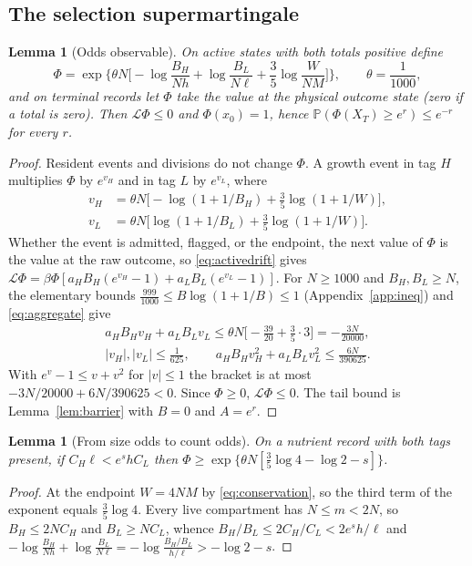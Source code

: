 \documentclass[11pt,a4paper]{article}
\theoremstyle{plain}
\newtheorem{lemma}[theorem]{Lemma}
\theoremstyle{definition}
\theoremstyle{remark}
\newcommand{\Prb}{\mathbb P}
\newcommand{\cL}{\mathcal L}
\begin{document}
\subsection{The selection supermartingale}
\begin{lemma}[Odds observable]\label{lem:odds}
On active states with both totals positive define
\begin{equation}\label{eq:oddsobservable}
\Phi=\exp\Big\{\theta N\Big[-\log\frac{B_H}{Nh}+\log\frac{B_L}{N\ell}+\frac35\log\frac{W}{NM}\Big]\Big\},\qquad \theta=\frac1{1000},
\end{equation}
and on terminal records let $\Phi$ take the value at the physical outcome state (zero if a total is zero). Then $\cL\Phi\leq0$ and $\Phi(x_0)=1$, hence $\Prb(\Phi(X_T)\geq e^{r})\leq e^{-r}$ for every $r$.
\end{lemma}
\begin{proof}
Resident events and divisions do not change $\Phi$. A growth event in tag $H$ multiplies $\Phi$ by $e^{v_H}$ and in tag $L$ by $e^{v_L}$, where
\begin{align*}
v_H&=\theta N\big[-\log(1+1/B_H)+\tfrac35\log(1+1/W)\big],\\
v_L&=\theta N\big[\log(1+1/B_L)+\tfrac35\log(1+1/W)\big].
\end{align*}
Whether the event is admitted, flagged, or the endpoint, the next value of $\Phi$ is the value at the raw outcome, so \eqref{eq:activedrift} gives $\cL\Phi=\beta\Phi[a_HB_H(e^{v_H}-1)+a_LB_L(e^{v_L}-1)]$. For $N\geq1000$ and $B_H,B_L\geq N$, the elementary bounds $\frac{999}{1000}\leq B\log(1+1/B)\leq1$ (Appendix~\ref{app:ineq}) and \eqref{eq:aggregate} give
\begin{gather*}
a_HB_Hv_H+a_LB_Lv_L\leq\theta N\big[-\tfrac{39}{20}+\tfrac35\cdot3\big]=-\frac{3N}{20000},\\
|v_H|,|v_L|\leq\frac1{625},\qquad a_HB_Hv_H^2+a_LB_Lv_L^2\leq\frac{6N}{390625}.
\end{gather*}
With $e^{v}-1\leq v+v^2$ for $|v|\leq1$ the bracket is at most $-3N/20000+6N/390625<0$. Since $\Phi\geq0$, $\cL\Phi\leq0$. The tail bound is Lemma~\ref{lem:barrier} with $B=0$ and $A=e^r$.
\end{proof}

\begin{lemma}[From size odds to count odds]\label{lem:endpoint}
On a nutrient record with both tags present, if $C_H\ell<e^{s}hC_L$ then $\Phi\geq\exp\{\theta N[\frac35\log4-\log2-s]\}$.
\end{lemma}
\begin{proof}
At the endpoint $W=4NM$ by \eqref{eq:conservation}, so the third term of the exponent equals $\frac35\log4$. Every live compartment has $N\leq m<2N$, so $B_H\leq2NC_H$ and $B_L\geq NC_L$, whence $B_H/B_L\leq2C_H/C_L<2e^{s}h/\ell$ and $-\log\frac{B_H}{Nh}+\log\frac{B_L}{N\ell}=-\log\frac{B_H/B_L}{h/\ell}>-\log2-s$.
\end{proof}
\end{document}

